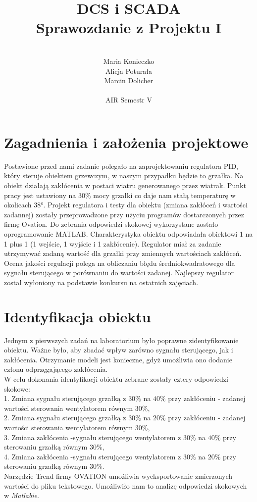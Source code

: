 \documentclass[12pt, a4paper]{article}
\author{
	\\ Maria Konieczko
	\\ Alicja Poturała
	\\ Marcin Dolicher
	\\
	\\ AIR Semestr V
}
\title{	
    DCS i SCADA \\
	Sprawozdanie z Projektu I		
}
\date{}
\begin{document}
\maketitle
\newpage
\tableofcontents

\newpage
\section{Zagadnienia i założenia projektowe}
Postawione przed nami zadanie polegało na zaprojektowaniu regulatora PID, który steruje obiektem grzewczym, w naszym przypadku będzie to grzałka. Na obiekt działają zakłócenia w postaci wiatru generowanego przez wiatrak. Punkt pracy jest ustawiony na $30 \%$ mocy grzałki co daje nam stałą temperaturę w okolicach \ang{38}. Projekt regulatora i testy dla obiektu (zmiana zakłóceń i wartości zadannej) zostały przeprowadzone przy użyciu programów dostarczonych przez firmę Ovation. Do zebrania odpowiedzi skokowej wykorzystane zostało oprogramowanie MATLAB. Charakterystyka obiektu odpowiadała obiektowi 1 na 1 plus 1 (1 wejście, 1 wyjście i 1 zakłócenie). Regulator miał za zadanie utrzymywać zadaną wartość dla grzałki przy zmiennych wartościach zakłóceń. Ocena jakości regulacji polega na obliczaniu błędu średniokwadratowego dla sygnału sterującego w porównaniu do wartości zadanej. Najlepszy regulator został wyłoniony na podstawie konkursu na ostatnich zajęciach. 
\section{Identyfikacja obiektu}
Jednym z pierwszych zadań na laboratorium było poprawne zidentyfikowanie obiektu. Ważne było, aby zbadać wpływ zarówno sygnału sterującego, jak i zakłócenia. Otrzymanie modeli jest konieczne, gdyż umożliwia ono dodanie członu odprzęgającego zakłócenia.\\
W celu dokonania identyfikacji obiektu zebrane zostały cztery odpowiedzi skokowe:\\
1. Zmiana sygnału sterującego grzałką z $30\%$ na $40\%$ przy zakłóceniu - zadanej wartości sterowania wentylatorem równym $30\%$,\\
2. Zmiana sygnału sterującego grzałką z $30\%$ na $20\%$ przy zakłóceniu - zadanej wartości sterowania wentylatorem równym $30\%$,\\
3. Zmiana zakłócenia -sygnału sterującego wentylatorem z $30\%$ na $40\%$ przy sterowaniu grzałką równym $30\%$,\\
4. Zmiana zakłócenia -sygnału sterującego wentylatorem z $30\%$ na $20\%$ przy sterowaniu grzałką równym $30\%$.\\
Narzędzie Trend firmy OVATION umożliwia wyeksportowanie zmierzonych wartości do pliku tekstowego. Umożliwiło nam to analizę odpowiedzi skokowych w \textit{Matlabie}.  
\end{document}
